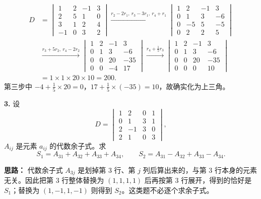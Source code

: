 \begin{align*}
D&=\begin{vmatrix}
1&2&-1&3\\
2&5&1&0\\
3&1&2&4\\
-1&0&3&2
\end{vmatrix}
\xrightarrow{r_2-2r_1,\ r_3-3r_1,\ r_4+r_1}
\begin{vmatrix}
1&2&-1&3\\
0&1&3&-6\\
0&-5&5&-5\\
0&2&2&5
\end{vmatrix}\\
&\xrightarrow{r_3+5r_2,\ r_4-2r_2}
\begin{vmatrix}
1&2&-1&3\\
0&1&3&-6\\
0&0&20&-35\\
0&0&-4&17
\end{vmatrix}
\xrightarrow{r_4+\frac{1}{5}r_3}
\begin{vmatrix}
1&2&-1&3\\
0&1&3&-6\\
0&0&20&-35\\
0&0&0&10
\end{vmatrix}\\
&=1\times1\times20\times10=200.
\end{align*}
第三步中 $-4+\frac{1}{5}\times20=0$，$17+\frac{1}{5}\times(-35)=10$，故确实化为上三角。


\else \answerarea[8] \fi%

\textbf{3.} 设
\[
D=\begin{vmatrix}
1&2&0&1\\
0&1&3&1\\
2&-1&3&0\\
2&1&0&3
\end{vmatrix},
\]
$A_{ij}$ 是元素 $a_{ij}$ 的代数余子式。求
\[
S_1=A_{31}+A_{32}+A_{33}+A_{34},\qquad
S_2=A_{31}-A_{32}+A_{33}-A_{34}.
\]

\ifshowsolutions%
\textbf{思路：} 代数余子式 $A_{3j}$ 是划掉第 $3$ 行、第 $j$ 列后算出来的，与第 $3$ 行本身的元素无关。因此把第 $3$ 行整体替换为 $(1,1,1,1)$ 后再按第 $3$ 行展开，得到的恰好是 $S_1$；替换为 $(1,-1,1,-1)$ 则得到 $S_2$。这类题不必逐个求余子式。

